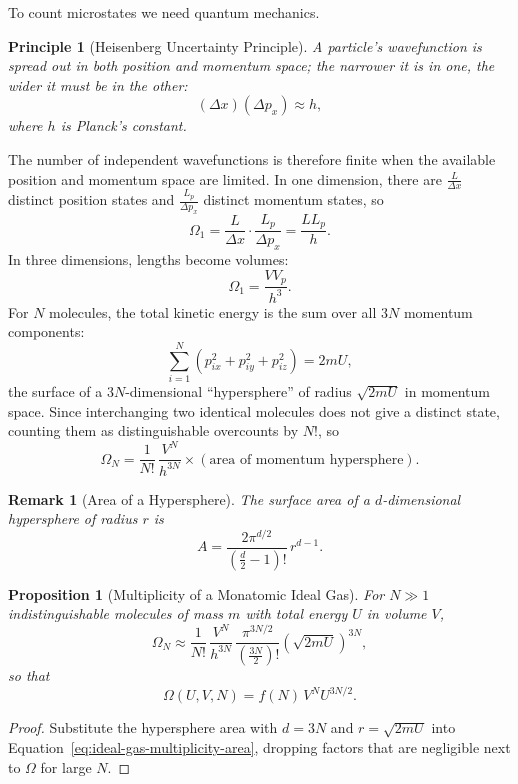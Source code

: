 \documentclass{article}
\newtheorem{principle}{Principle}
\newtheorem{remark}{Remark}
\newtheorem{proposition}{Proposition}
\begin{document}
To count microstates we need quantum mechanics.
\begin{principle}[Heisenberg Uncertainty Principle]
    A particle's wavefunction is spread out in both position and momentum space; the narrower it is in one, the wider it must be in the other:
    \begin{equation}
        \label{eq:heisenberg-principle}
        (\Delta x)(\Delta p_x) \approx h,
    \end{equation}
    where $h$ is Planck's constant.
\end{principle}
The number of independent wavefunctions is therefore finite when the available position and momentum space are limited. In one dimension, there are $\frac{L}{\Delta x}$ distinct position states and $\frac{L_p}{\Delta p_x}$ distinct momentum states, so
\[\Omega_1 = \frac{L}{\Delta x}\cdot\frac{L_p}{\Delta p_x} = \frac{L L_p}{h}.\]
In three dimensions, lengths become volumes:
\begin{equation}
    \label{eq:one-atom-multiplicity}
    \Omega_1 = \frac{V V_p}{h^3}.
\end{equation}
For $N$ molecules, the total kinetic energy is the sum over all $3N$ momentum components:
\[\sum_{i=1}^{N}\left(p_{ix}^2 + p_{iy}^2 + p_{iz}^2\right) = 2mU,\]
the surface of a $3N$-dimensional ``hypersphere'' of radius $\sqrt{2mU}$ in momentum space. Since interchanging two identical molecules does not give a distinct state, counting them as distinguishable overcounts by $N!$, so
\begin{equation}
    \label{eq:ideal-gas-multiplicity-area}
    \Omega_N = \frac{1}{N!}\,\frac{V^N}{h^{3N}} \times (\text{area of momentum hypersphere}).
\end{equation}
\begin{remark}[Area of a Hypersphere]
    The surface area of a $d$-dimensional hypersphere of radius $r$ is
    \[A = \frac{2\pi^{d/2}}{\left(\frac{d}{2} - 1\right)!}\,r^{d-1}.\]
\end{remark}
\begin{proposition}[Multiplicity of a Monatomic Ideal Gas]
    For $N \gg 1$ indistinguishable molecules of mass $m$ with total energy $U$ in volume $V$,
    \begin{equation}
        \label{eq:ideal-gas-multiplicity}
        \Omega_N \approx \frac{1}{N!}\,\frac{V^N}{h^{3N}}\,\frac{\pi^{3N/2}}{\left(\frac{3N}{2}\right)!}\left(\sqrt{2mU}\right)^{3N},
    \end{equation}
    so that
    \begin{equation}
        \label{eq:ideal-gas-multiplicity-scaling}
        \Omega(U, V, N) = f(N)\,V^N U^{3N/2}.
    \end{equation}
\end{proposition}
\begin{proof}
    Substitute the hypersphere area with $d = 3N$ and $r = \sqrt{2mU}$ into Equation~\eqref{eq:ideal-gas-multiplicity-area}, dropping factors that are negligible next to $\Omega$ for large $N$.
\end{proof}
\end{document}
